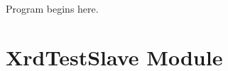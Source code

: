 \documentclass[letterpaper,10pt,english]{sphinxmanual}
\begin{document}

\begin{fulllineitems}
\label{ref-manual/XrdTestHypervisor:XrdTestHypervisor.main}
Program begins here.

\end{fulllineitems}



\section{XrdTestSlave Module}
\label{ref-manual/XrdTestSlave:module-XrdTestSlave}\label{ref-manual/XrdTestSlave:xrdtestslave-module}\label{ref-manual/XrdTestSlave::doc}
\end{document}
